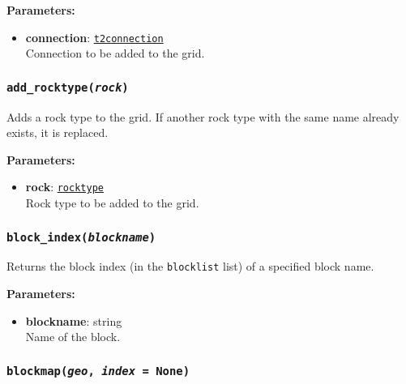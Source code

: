 \textbf{Parameters:}
\begin{itemize}
\item \textbf{connection}: \hyperref[t2connectionobjects]{\texttt{t2connection}}\\
  Connection to be added to the grid.
\end{itemize}

\begin{snugshade}
\subsubsection{\texttt{add\_rocktype(\emph{rock})}}
\end{snugshade}
\label{sec:t2grid:add_rocktype}

Adds a rock type to the grid.  If another rock type with the same name already exists, it is replaced.

\textbf{Parameters:}
\begin{itemize}
\item \textbf{rock}: \hyperref[rocktypeobjects]{\texttt{rocktype}}\\
  Rock type to be added to the grid.
\end{itemize}

\begin{snugshade}
\subsubsection{\texttt{block\_index(\emph{blockname})}}
\end{snugshade}
\label{sec:t2grid:block_index}

Returns the block index (in the \texttt{blocklist} list) of a specified block name.

\textbf{Parameters:}
\begin{itemize}
\item \textbf{blockname}: string\\
  Name of the block.
\end{itemize}

\begin{snugshade}
\subsubsection{\texttt{blockmap(\emph{geo}, \emph{index} = None)}}
\end{snugshade}
\label{sec:t2grid:blockmap}

